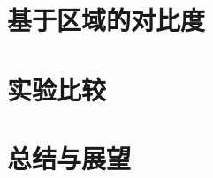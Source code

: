 \documentclass[final]{cvpr}
\begin{document}
\section{基于区域的对比度}

\section{实验比较}\label{sec:Experiment}




\section{总结与展望}\label{sec:Conclusion}




% 
% 

\end{document}
